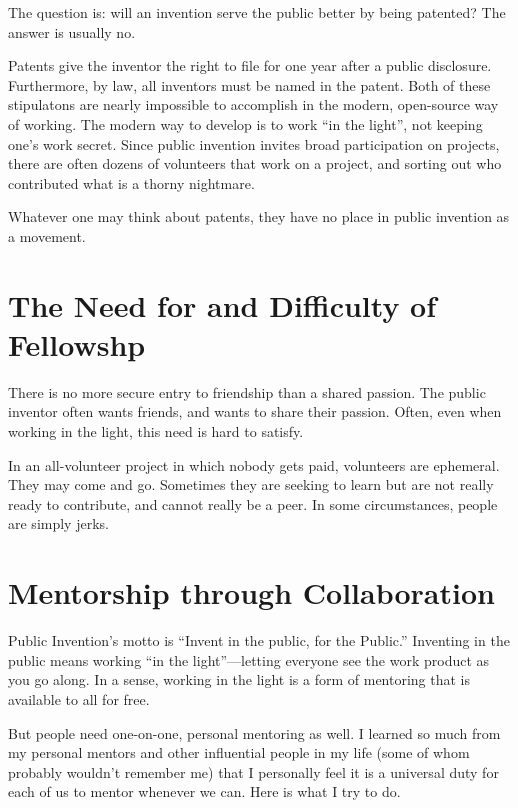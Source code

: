 \documentclass[
	fontsize=10pt, %
	twoside=false, %
	secnumdepth=1, %
]{kaobook}
\begin{document}
The question is: will an invention serve the public better
by being patented? The answer is usually no.

Patents give the inventor the right to file for one year
after a public disclosure. Furthermore, by law,
all inventors must be named in the patent. Both
of these stipulatons are nearly impossible to accomplish
in the modern, open-source way of working.
The modern way to develop is to work ``in the light'',
not keeping one's work secret.
Since public invention invites broad participation on projects,
there are often dozens of volunteers that work on a project,
and sorting out who contributed what is a thorny nightmare.

Whatever one may think about patents, they have no
place in public invention as a movement.

\section{The Need for and Difficulty of Fellowshp}

There is no more secure entry to friendship than a shared passion.
The public inventor often wants friends, and wants to share
their passion.
Often, even when working in the light, this need
is hard to satisfy.

In an all-volunteer project in which nobody gets paid,
volunteers are ephemeral. They may come and go.
Sometimes they are seeking to learn but are not
really ready to contribute, and cannot really
be a peer.
In some circumstances, people are simply jerks.

\section{Mentorship through Collaboration}

Public Invention’s motto is “Invent in the public, for the Public.”
Inventing in the public means working “in the light”---letting everyone see the work product as you go along.
In a sense, working in the light is a form of mentoring that is available to all for free.

But people need one-on-one, personal mentoring as well. I learned so much from my personal mentors and other influential people in my life (some of whom probably wouldn’t remember me) that I personally feel it is a universal duty for each of us to mentor whenever we can. Here is what I try to do.
\end{document}
